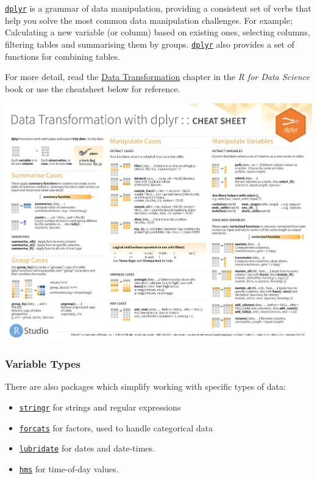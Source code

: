 \documentclass[]{book}
\providecommand{\tightlist}{%
  \setlength{\itemsep}{0pt}\setlength{\parskip}{0pt}}
\begin{document}
\href{http://dplyr.tidyverse.org}{\texttt{dplyr}} is a grammar of data manipulation, providing a
consistent set of verbs that help you solve the most common data manipulation challenges. For
example; Calculating a new variable (or column) based on existing ones, selecting columns,
filtering tables and summarising them by groups. \href{http://dplyr.tidyverse.org}{\texttt{dplyr}} also
provides a set of functions for combining tables.

For more detail, read the \href{https://r4ds.had.co.nz/transform.html}{Data Transformation} chapter in
the \emph{R for Data Science} book or use the cheatsheet below for reference.

\href{https://github.com/rstudio/cheatsheets/raw/master/data-transformation.pdf}{\includegraphics{images/data-transformation.png}}

\hypertarget{variable-types}{%
\subsubsection{Variable Types}\label{variable-types}}

There are also packages which simplify working with specific types of data:

\begin{itemize}
\tightlist
\item
  \href{http://stringr.tidyverse.org/}{\texttt{stringr}} for strings and regular expressions
\item
  \href{http://forcats.tidyverse.org/}{\texttt{forcats}} for factors, used to handle categorical data
\item
  \href{http://lubridate.tidyverse.org/}{\texttt{lubridate}} for dates and date-times.
\item
  \href{https://www.rdocumentation.org/packages/hms}{\texttt{hms}} for time-of-day values.
\end{itemize}
\end{document}
